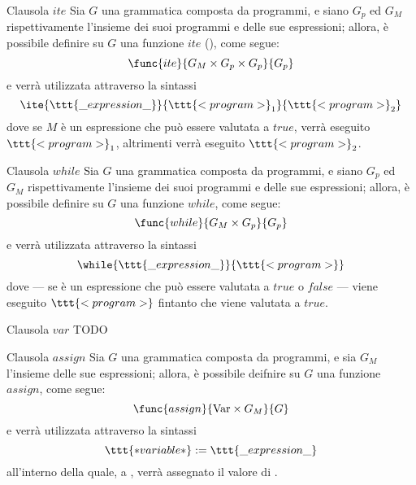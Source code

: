 \documentclass[a4paper, 12pt]{report}
\begin{document}
    \begin{frameddefn}{Clausola $ite$}
        Sia $G$ una grammatica composta da programmi, e siano $G_p$ ed $G_M$ rispettivamente l'insieme dei suoi programmi e delle sue espressioni; allora, è possibile definire su $G$ una funzione $ite$ (), come segue: $$\func{ite}{G_M \times G_p \times G_p}{G_p}$$ e verrà utilizzata attraverso la sintassi $$\ite{\ttt{\_expression\_}}{\ttt{<program>}_1}{\ttt{<program>}_2}$$ dove se $M$ è un espressione che può essere valutata a $true$, verrà eseguito $\ttt{<program>}_1$, altrimenti verrà eseguito $\ttt{<program>}_2$.
    \end{frameddefn}

    \begin{frameddefn}{Clausola $while$}
        Sia $G$ una grammatica composta da programmi, e siano $G_p$ ed $G_M$ rispettivamente l'insieme dei suoi programmi e delle sue espressioni; allora, è possibile definire su $G$ una funzione $while$, come segue: $$\func{while}{G_M \times G_p}{G_p}$$ e verrà utilizzata attraverso la sintassi $$\while{\ttt{\_expression\_}}{\ttt{<program>}}$$ dove --- se  è un espressione che può essere valutata a $true$ o $false$ --- viene eseguito $\ttt{<program>}$ fintanto che  viene valutata a $true$.
    \end{frameddefn}

    \begin{frameddefn}{Clausola $var$}
        TODO
    \end{frameddefn}

    \begin{frameddefn}{Clausola $assign$}
        Sia $G$ una grammatica composta da programmi, e sia $G_M$ l'insieme delle sue espressioni; allora, è possibile deifnire su $G$ una funzione $assign$, come segue: $$\func{assign}{\mathrm{Var} \times G_M}{G}$$ e verrà utilizzata attraverso la sintassi $$\ttt{*variable*}  := \ttt{\_expression\_}$$ all'interno della quale, a , verrà assegnato il valore di .
    \end{frameddefn}
\end{document}
